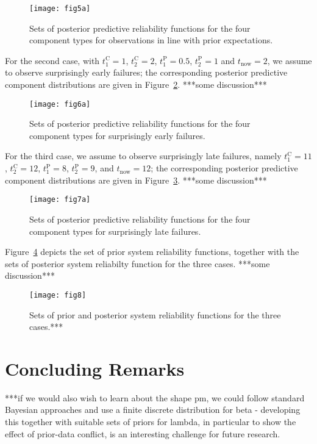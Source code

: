 \documentclass[Journal,SectionNumbers,SingleSpace,InsideFigs]{ascelike}
\def\tnow{t_\text{now}}
\begin{document}
\begin{figure}
\texttt{[image: fig5a]}
\caption{Sets of posterior predictive reliability functions for the four component types
for observations in line with prior expectations.}
\label{fig:comppost-1}
\end{figure}

For the second case, with $t_1^\text{C} = 1$, $t_2^\text{C} = 2$, $t_1^\text{P} = 0.5$, $t_2^\text{P} = 1$
and $\tnow = 2$, we assume to observe surprisingly early failures;
the corresponding posterior predictive component distributions are given in Figure~\ref{fig:comppost-2}.
***some discussion***

\begin{figure}
\texttt{[image: fig6a]}
\caption{Sets of posterior predictive reliability functions for the four component types
for surprisingly early failures.}
\label{fig:comppost-2}
\end{figure}

For the third case, we assume to observe surprisingly late failures,
namely $t_1^\text{C} = 11$, $t_2^\text{C} = 12$, $t_1^\text{P} = 8$, $t_2^\text{P} = 9$, and $\tnow = 12$;
the corresponding posterior predictive component distributions are given in Figure~\ref{fig:comppost-3}.
***some discussion***

\begin{figure}
\texttt{[image: fig7a]}
\caption{Sets of posterior predictive reliability functions for the four component types
for surprisingly late failures.}
\label{fig:comppost-3}
\end{figure}

Figure~\ref{fig:brake-sysrels} depicts the set of prior system reliability functions,
together with the sets of posterior system reliabilty function for the three cases.
***some discussion***

\begin{figure}
\texttt{[image: fig8]}
\caption{Sets of prior and posterior system reliability functions for the three cases.*** }
\label{fig:brake-sysrels}
\end{figure}


\section{Concluding Remarks}
\label{sec:concluding}

***if we would also wish to learn about the shape pm, we could follow
standard Bayesian approaches and use a finite discrete distribution for beta - developing this together
with suitable sets of priors for lambda, in particular to show the effect of prior-data conflict, is an interesting
challenge for future research.
\end{document}

